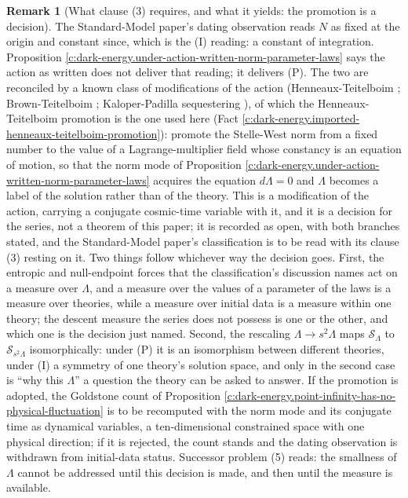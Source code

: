 \documentclass[11pt]{article}
\theoremstyle{definition}
\newtheorem{remark}[theorem]{Remark}
\theoremstyle{plain}
\begin{document}
\begin{remark}[What clause (3) requires, and what it yields: the promotion is a decision]\label{c:note.dark-energy.what-clause-3-requires-what-it}
The Standard-Model paper's dating observation reads $N$ as fixed at the origin and constant since, which is the (I) reading: a constant of integration. Proposition \ref{c:dark-energy.under-action-written-norm-parameter-laws} says the action as written does not deliver that reading; it delivers (P). The two are reconciled by a known class of modifications of the action (Henneaux-Teitelboim \cite{HenneauxTeitelboim1989}; Brown-Teitelboim \cite{BrownTeitelboim1988}; Kaloper-Padilla sequestering \cite{KaloperPadilla2014}), of which the Henneaux-Teitelboim promotion is the one used here (Fact \ref{c:dark-energy.imported-henneaux-teitelboim-promotion}): promote the Stelle-West norm from a fixed number to the value of a Lagrange-multiplier field whose constancy is an equation of motion, so that the norm mode of Proposition \ref{c:dark-energy.under-action-written-norm-parameter-laws} acquires the equation $d\Lambda = 0$ and $\Lambda$ becomes a label of the solution rather than of the theory. This is a modification of the action, carrying a conjugate cosmic-time variable with it, and it is a decision for the series, not a theorem of this paper; it is recorded as open, with both branches stated, and the Standard-Model paper's classification is to be read with its clause (3) resting on it. Two things follow whichever way the decision goes. First, the entropic and null-endpoint forces that the classification's discussion names act on a measure over $\Lambda$, and a measure over the values of a parameter of the laws is a measure over theories, while a measure over initial data is a measure within one theory; the descent measure the series does not possess is one or the other, and which one is the decision just named. Second, the rescaling $\Lambda \to s^2\Lambda$ maps $\mathcal{S}_\Lambda$ to $\mathcal{S}_{s^2\Lambda}$ isomorphically: under (P) it is an isomorphism between different theories, under (I) a symmetry of one theory's solution space, and only in the second case is ``why this $\Lambda$'' a question the theory can be asked to answer. If the promotion is adopted, the Goldstone count of Proposition \ref{c:dark-energy.point-infinity-has-no-physical-fluctuation} is to be recomputed with the norm mode and its conjugate time as dynamical variables, a ten-dimensional constrained space with one physical direction; if it is rejected, the count stands and the dating observation is withdrawn from initial-data status. Successor problem (5) reads: the smallness of $\Lambda$ cannot be addressed until this decision is made, and then until the measure is available.
\end{remark}
\end{document}
